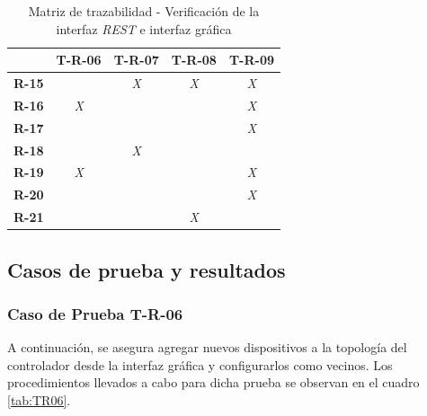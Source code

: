 \begin{table}[!h]
    \centering
    \begin{tabular}{|c|c|c|c|c|}
      \hline
      \textbf{}     & \textbf{T-R-06} & \textbf{T-R-07}    & \textbf{T-R-08} & \textbf{T-R-09} \\ \hline
      \textbf{R-15} & \textit{}       & \textit{X}         & \textit{X}      & \textit{X}      \\ \hline
      \textbf{R-16} & \textit{X}      & \textit{}          & \textit{}       & \textit{X}      \\ \hline
      \textbf{R-17} & \textit{}       & \textit{\textbf{}} & \textit{}       & \textit{X}      \\ \hline
      \textbf{R-18} & \textit{}       & \textit{X}         & \textit{}       & \textit{}       \\ \hline
      \textbf{R-19} & \textit{X}      & \textit{}          & \textit{}       & \textit{X}      \\ \hline
      \textbf{R-20} & \textit{}       & \textit{}          & \textit{}       & \textit{X}      \\ \hline
      \textbf{R-21} & \textit{}       & \textit{}          & \textit{X}      & \textit{}       \\ \hline
      \end{tabular}
    \caption{Matriz de trazabilidad - Verificación de la interfaz \textit{REST} e interfaz gráfica}
    \label{tab:matriz_rest}
\end{table}


\subsection{Casos de prueba y resultados}

\subsubsection{Caso de Prueba T-R-06}

A continuación, se asegura agregar nuevos dispositivos a la topología del controlador desde la interfaz gráfica y configurarlos como vecinos. Los procedimientos llevados a cabo para dicha prueba se observan en el cuadro \ref{tab:TR06}.


